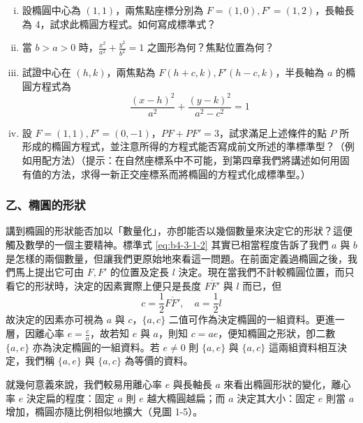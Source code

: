 \begin{exercise}
\begin{enumerate}[(i)]
  \item 設橢圓中心為 $(1,1)$，兩焦點座標分別為 $F=(1,0), F'=(1,2)$，長軸長為 4，試求此橢圓方程式。如何寫成標準式？
  \item 當 $b > a > 0$ 時，$\frac{x^2}{a^2} + \frac{y^2}{b^2} = 1$ 之圖形為何？焦點位置為何？
  \item 試證中心在 $(h,k)$，兩焦點為 $F(h+c, k), F'(h-c, k)$，半長軸為 $a$ 的橢圓方程式為
  \[ \frac{(x-h)^2}{a^2} + \frac{(y-k)^2}{a^2 - c^2} = 1 \]
  \item 設 $F=(1,1), F'=(0,-1)$，$PF + PF' = 3$，試求滿足上述條件的點 $P$ 所形成的橢圓方程式，並注意所得的方程式能否寫成前文所述的準標準型？（例如用配方法）（提示：在自然座標系中不可能，到第四章我們將講述如何用固有值的方法，求得一新正交座標系而將橢圓的方程式化成標準型。）
\end{enumerate}
\end{exercise}

\subsubsection*{乙、橢圓的形狀}

講到橢圓的形狀能否加以「數量化」，亦卽能否以幾個數量來決定它的形狀？這便觸及數學的一個主要精神。標準式 \eqref{eq:b4-3-1-2} 其實已相當程度告訴了我們 $a$ 與 $b$ 是怎樣的兩個數量，但讓我們更原始地來看這一問題。在前面定義過橢圓之後，我們馬上提出它可由 $F, F'$ 的位置及定長 $l$ 決定。現在當我們不計較橢圓位置，而只看它的形狀時，決定的因素實際上便只是長度 $\overline{FF'}$ 與 $l$ 而已，但
\[ c = \frac{1}{2}\overline{FF'}, \quad a = \frac{1}{2}l \]
故決定的因素亦可視為 $a$ 與 $c$，$\{a, c\}$ 二值可作為決定橢圓的一組資料。更進一層，因離心率 $e = \frac{c}{a}$，故若知 $e$ 與 $a$，則知 $c = ae$，便知橢圓之形狀，卽二數 $\{a, e\}$ 亦為決定橢圓的一組資料。若 $e \neq 0$ 則 $\{a, e\}$ 與 $\{a, c\}$ 這兩組資料相互決定，我們稱 $\{a, e\}$ 與 $\{a, c\}$ 為等價的資料。

就幾何意義來說，我們較易用離心率 $e$ 與長軸長 $a$ 來看出橢圓形狀的變化，離心率 $e$ 決定扁的程度：固定 $a$ 則 $e$ 越大橢圓越扁；而 $a$ 決定其大小：固定 $e$ 則當 $a$ 增加，橢圓亦隨比例相似地擴大（見圖 1-5）。

